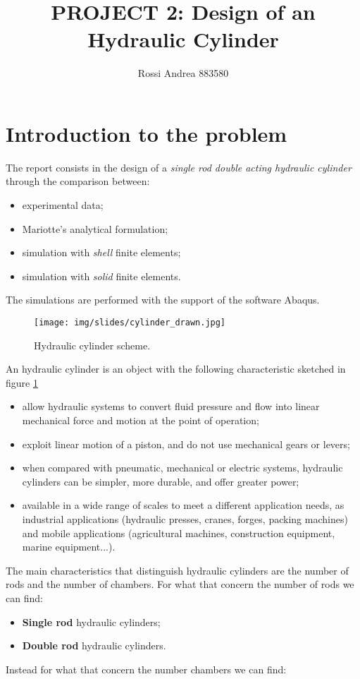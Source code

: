 \documentclass[a4paper,12pt]{article}
\title{PROJECT 2: Design of an Hydraulic Cylinder}
\author{Rossi Andrea 883580}
\date{}
\begin{document}
\maketitle

\section{Introduction to the problem}

The report consists in the design of a \emph{single rod double acting hydraulic cylinder} through the comparison between:
\begin{itemize}
\item experimental data;
\item Mariotte's analytical formulation;
\item simulation with \emph{shell} finite elements;
\item simulation with \emph{solid} finite elements.
\end{itemize}
The simulations are performed with the support of the software Abaqus.

\begin{figure}[H]
\centering
\texttt{[image: img/slides/cylinder\_drawn.jpg]}
\label{fig:cylinder_drawn}
\caption{Hydraulic cylinder scheme.}
\end{figure}

An hydraulic cylinder is an object with the following characteristic sketched in figure \ref{fig:cylinder_drawn}
\begin{itemize}
\item allow hydraulic systems to convert fluid pressure and flow into linear mechanical force and motion at the point of operation;
\item exploit linear motion of a piston, and do not use mechanical gears or levers;
\item when compared with pneumatic, mechanical or electric systems, hydraulic cylinders can be simpler, more durable, and offer greater power;
\item available in a wide range of scales to meet a different application needs, as industrial applications (hydraulic presses, cranes, forges, packing machines) and mobile applications (agricultural machines, construction equipment, marine equipment...).
\end{itemize}

The main characteristics that distinguish hydraulic cylinders are the number of rods and the number of chambers.
For what that concern the number of rods we can find:
\begin{itemize}
\item \textbf{Single rod} hydraulic cylinders;
\item \textbf{Double rod} hydraulic cylinders.
\end{itemize}
Instead for what that concern the number chambers we can find:
\end{document}
